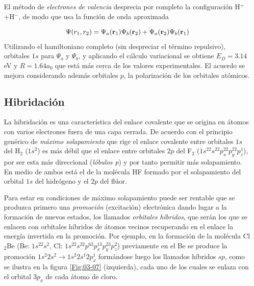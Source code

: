 El método de \textit{electrones de valencia} desprecia por completo la configuración  H$^+$+H$^-$, de modo que usa la función de onda aproximada

\begin{equation}
    \Psi (r_1,r_2) =  \Psi_a (\mathbf{r}_1) \Psi_b (\mathbf{r}_2) + \Psi_a (\mathbf{r}_2) \Psi_b (\mathbf{r}_1)
\end{equation}
Utilizando el hamiltoniano completo (sin despreciar el término repulsivo), orbitales $1s$ para $\Psi_a$ y $\Psi_b$, y aplicando el cálculo variacional se obtiene $E_D = 3.14$ eV y $R=1.64a_0$ que está más cerca de los valores experimentales. El acuerdo se mejora considerando además orbitales $p$, la polarización de los orbitales atómicos.

\subsection{Hibridación} \label{Subsec:03-04-03}

La hibridación es una característica del enlace covalente que se origina en átomos con varios electrones fuera de una capa cerrada. De acuerdo con el principio genérico de \textit{máximo solapamiento} que rige el enlace covalente entre orbitales $1s$ del H$_2$ ($1s^2$) es más débil que el enlace entre orbitales $2p$ del F$_2$ ($1s^22s^22p_x^22p_y^22p_z^1$), por ser esta más direccional (\textit{lóbulos p}) y por tanto permitir más solapamiento. En medio de ambos está el de la molécula HF formado por el solapamiento del orbital $1s$ del hidrógeno y el $2p$ del flúor.

Para estar en condiciones de máximo solapamiento puede ser rentable que se produzca primero una \textit{promoción} (excitación) electrónica dando lugar a la formación de nuevos estados, los llamados \textit{orbitales híbridos}, que serán los que se enlacen con orbitales híbridos de átomos vecinos recuperando en el enlace la energía invertida en la promoción. Por ejemplo, en la formación de la molécula Cl$_2$Be (Be: $1s^22s^2$, Cl: $1s^22s^22p^63p_x^13p_y^23p_z^2$) previamente en el Be se produce la promoción $1s^2 2s^2 \rightarrow 1s^2 2s^1 2p_x^1$ formándose luego los llamados híbridos $sp$, como se ilustra en la figura \ref{Fig:03-07} (izquierda), cada uno de los cuales se enlaza con el orbital $3p_x$ de cada átomo de cloro.

